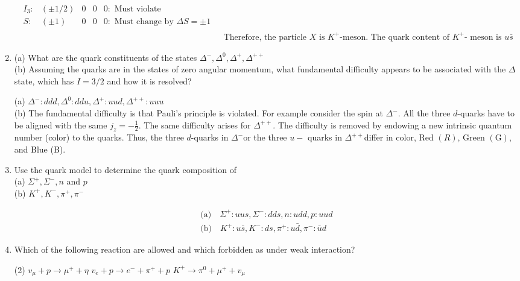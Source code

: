 \begin{enumerate}
\begin{answer}
\begin{align*}
\begin{array}{lllll}
		I_3:&(\pm 1 / 2) & 0 & 0 & 0:\text{ Must violate}\\
		S: &(\pm 1) & 0 & 0 &0:\text{ Must change}\text { by } \Delta S=\pm 1
		\end{array}\\
		&\text { Therefore, the particle } X \text { is } K^{+} \text {-meson. The quark content of } K^{+} \text {- meson is } u \bar{s}
		\end{align*}
	\end{answer}
	\item (a) What are the quark constituents of the states $\Delta^{-}, \Delta^0, \Delta^{+}, \Delta^{++}$\\
	(b) Assuming the quarks are in the states of zero angular momentum, what fundamental difficulty appears to be associated with the $\Delta$ state, which has $I=3 / 2$ and how it is resolved?
		\begin{answer}
		(a) $\Delta^{-}: d d d, \Delta^0: d d u, \Delta^{+}: u u d, \Delta^{++}: u u u$\\	
	(b) The fundamental difficulty is that Pauli's principle is violated. For example consider the spin at $\Delta^{-}$. All the three $d$-quarks have to be aligned with the same $j_z=-\frac{1}{2}$. The same difficulty arises for $\Delta^{++}$. The difficulty is removed by endowing a new intrinsic quantum number (color) to the quarks. Thus, the three $d$-quarks in $\Delta^{-}$or the three $u-$ quarks in $\Delta^{++}$differ in color, Red $(R)$, Green $(\mathrm{G})$, and Blue (B).
	\end{answer}
	\item Use the quark model to determine the quark composition of\\
	(a) $\Sigma^{+}, \Sigma^{-}, n$ and $p$\\
	(b) $K^{+}, K^{-}, \pi^{+}, \pi^{-}$
	\begin{answer}
	\begin{align*}
\text{(a)} \quad \Sigma^{+}: u u s, \Sigma^{-}: d d s, n: u d d, p: u u d\\
\text{(b)} \quad  K^{+}: u \bar{s}, K^{-}: d s, \pi^{+}: u \bar{d}, \pi^{-}: \bar{u} d
	\end{align*}
\end{answer}
	\item Which of the following reaction are allowed and which forbidden as under weak interaction?
	 \begin{tasks}(2)
		\task[\textbf{a.}] $v_\mu+p \rightarrow \mu^{+}+\eta$
		\task[\textbf{b.}]$v_e+p \rightarrow e^{-}+\pi^{+}+p$
		\task[\textbf{c.}]$K^{+} \rightarrow \pi^0+\mu^{+}+v_\mu$

\end{tasks}
\end{enumerate}
